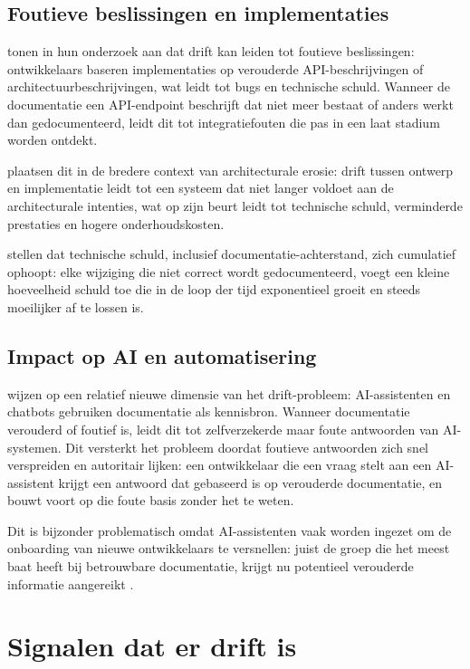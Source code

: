 \subsection{Foutieve beslissingen en implementaties}
\textcite{romeo2024didrift} tonen in hun onderzoek aan dat drift kan leiden tot foutieve beslissingen: ontwikkelaars baseren implementaties op verouderde API-beschrijvingen of architectuurbeschrijvingen, wat leidt tot bugs en technische schuld. Wanneer de documentatie een API-endpoint beschrijft dat niet meer bestaat of anders werkt dan gedocumenteerd, leidt dit tot integratiefouten die pas in een laat stadium worden ontdekt.

\textcite{whiting2020drifterosion} plaatsen dit in de bredere context van architecturale erosie: drift tussen ontwerp en implementatie leidt tot een systeem dat niet langer voldoet aan de architecturale intenties, wat op zijn beurt leidt tot technische schuld, verminderde prestaties en hogere onderhoudskosten.

\textcite{tripathy2014softwareevolution} stellen dat technische schuld, inclusief documentatie-achterstand, zich cumulatief ophoopt: elke wijziging die niet correct wordt gedocumenteerd, voegt een kleine hoeveelheid schuld toe die in de loop der tijd exponentieel groeit en steeds moeilijker af te lossen is.

\subsection{Impact op AI en automatisering}
\textcite{theunissen2022mappingdocumentation} wijzen op een relatief nieuwe dimensie van het drift-probleem: AI-assistenten en chatbots gebruiken documentatie als kennisbron. Wanneer documentatie verouderd of foutief is, leidt dit tot zelfverzekerde maar foute antwoorden van AI-systemen. Dit versterkt het probleem doordat foutieve antwoorden zich snel verspreiden en autoritair lijken: een ontwikkelaar die een vraag stelt aan een AI-assistent krijgt een antwoord dat gebaseerd is op verouderde documentatie, en bouwt voort op die foute basis zonder het te weten.

Dit is bijzonder problematisch omdat AI-assistenten vaak worden ingezet om de onboarding van nieuwe ontwikkelaars te versnellen: juist de groep die het meest baat heeft bij betrouwbare documentatie, krijgt nu potentieel verouderde informatie aangereikt \autocite{bhatti2021docsdevelopers}.

\section{Signalen dat er drift is}
\label{sec:drift-signalen}

